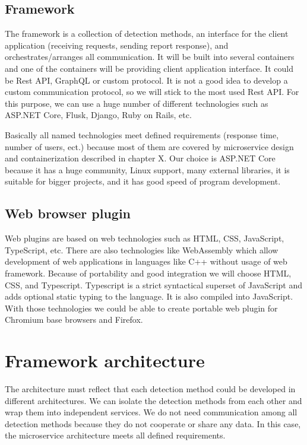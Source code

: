 \section{Framework}

The framework is a collection of detection methods, an interface for the client application (receiving requests, sending report response), and orchestrates/arranges all communication. It will be built into several containers and one of the containers will be providing client application interface. It could be Rest API, GraphQL or custom protocol. It is not a good idea to develop a custom communication protocol, so we will stick to the most used Rest API. For this purpose, we can use a huge number of different technologies such as ASP.NET Core, Flusk, Django, Ruby on Rails, etc.

Basically all named technologies meet defined requirements (response time, number of users, ect.) because most of them are covered by microservice design and containerization described in chapter X. Our choice is ASP.NET Core because it has a huge community, Linux support, many external libraries, it is suitable for bigger projects, and it has good speed of program development.

\section{Web browser plugin}

Web plugins are based on web technologies such as HTML, CSS, JavaScript, TypeScript, etc. There are also technologies like WebAssembly which allow development of web applications in languages like C++ without usage of web framework. Because of portability and good integration we will choose HTML, CSS, and Typescript. Typescript is a strict syntactical superset of JavaScript and adds optional static typing to the language. It is also compiled into JavaScript. With those technologies we could be able to create portable web plugin for Chromium base browsers and Firefox.

\chapter{Framework architecture}

The architecture must reflect that each detection method could be developed in different architectures. We can isolate the detection methods from each other and wrap them into independent services. We do not need communication among all detection methods because they do not cooperate or share any data. In this case, the microservice architecture meets all defined requirements.


